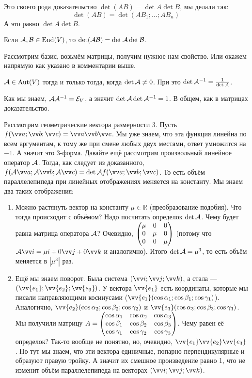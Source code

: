 \documentclass{article}
\let\vec\vv
\newcommand{\id}{{\mathcal{E}}}
\begin{document}
\begin{itemize}
        \begin{Comment}
            Это своего рода доказательство $\det(AB)=\det A\det B$, мы делали так:
            $$\det(AB)=\det(AB_1;\ldots;AB_n)$$
            А это равно $\det A\det B$.
        \end{Comment}
        \thm Если ${\mathcal{A}},{\mathcal{B}}\in\operatorname{End}(V)$, то $\det({\mathcal{A}}{\mathcal{B}})=\det{\mathcal{A}}\det{\mathcal{B}}$.
        \begin{Proof}
            Рассмотрим базис, возьмём матрицы, получим нужное нам свойство. Или окажем напрямую как указано в комментарии выше.
        \end{Proof}
        \thm ${\mathcal{A}}\in\operatorname{Aut}(V)$ тогда и только тогда, когда $\det{\mathcal{A}}\neq0$. При это $\det{\mathcal{A}}^{-1}=\frac1{\det{\mathcal{A}}}$.
        \begin{Proof}
            Как мы знаем, $\scriptA\scriptA^{-1}=\id_V$, а значит $\det{\mathcal{A}}\det{\mathcal{A}}^{-1}=1$. В общем, как в матрицах доказательство.
        \end{Proof}
        \begin{Example}
            Рассмотрим геометрические вектора размерности 3. Пусть $f(\vec a;\vec b;\vec c)=\vec a\vec b\vec c$. Мы уже знаем, что эта функция линейна по всем аргументам, к тому же при смене любых двух местами, ответ умножится на $-1$. А значит это 3-форма. Давайте ещё рассмотрим произвольный линейное оператор ${\mathcal{A}}$. Тогда, как следует из доказанного, $f(\scriptA\vec a;\scriptA\vec b;\scriptA\vec c)=\det\scriptA f(\vec a;\vec b;\vec c)$. То есть объём параллелепипеда при линейных отображениях меняется на константу. Мы знаем два таких отображения:
            \begin{enumerate}
                \item Можно растянуть вектор на константу $\mu\in\mathbb R$ (преобразование подобия). Что тогда происходит с объёмом? Надо посчитать определок $\det{\mathcal{A}}$. Чему будет равна матрица оператора ${\mathcal{A}}$? Очевидно, $\left(\begin{matrix}\mu & 0 & 0\\0 & \mu & 0\\0 & 0 & \mu\end{matrix}\right)$ (потому что $\scriptA\vec i=\mu i+0\vec j+0\vec k$ и аналогично). Итого $\det{\mathcal{A}}=\mu^3$, то есть объём меняется в $|\mu^3|$ раз.
                \item Ещё мы знаем поворот. Была система $(\vec i;\vec j;\vec k)$, а стала --- $(\vec{e_1};\vec{e_2};\vec{e_3})$. У вектора $\vec{e_1}$ есть координаты, которые мы писали направляющими косинусами ($\vec{e_1}(\cos\alpha_1;\cos\beta_1;\cos\gamma_1)$). Аналогично, $\vec{e_2}(\cos\alpha_2;\cos\beta_2;\cos\gamma_2)$ и $\vec{e_3}(\cos\alpha_3;\cos\beta_3;\cos\gamma_3)$. Мы получили матрицу $A=\left(\begin{matrix}\cos\alpha_1 & \cos\alpha_2 & \cos\alpha_3\\\cos\beta_1 & \cos\beta_2 & \cos\beta_3\\\cos\gamma_1 & \cos\gamma_2 & \cos\gamma_3\end{matrix}\right)$. Чему равен её определок? Так-то вообще не понятно, но, очевидно, $\vec{e_1}\vec{e_2}\vec{e_3}$. Но тут мы знаем, что эти вектора единичные, попарно перпендикулярные и образуют правую тройку. А значит их смешное произведение равно 1, что не изменит объём параллелепипеда на векторах $(\vec i;\vec j;\vec k)$.

\end{enumerate}
\end{Example}
\end{itemize}
\end{document}

